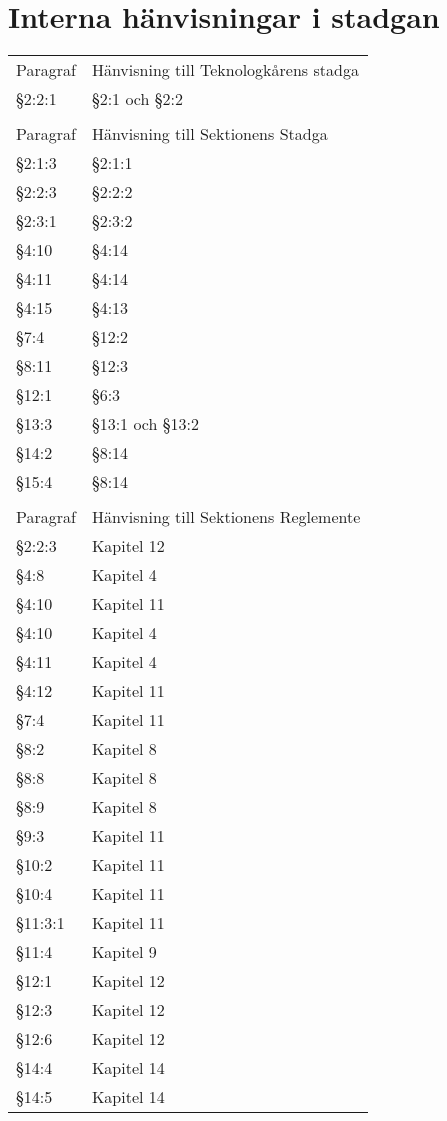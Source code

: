 \documentclass[10pt]{article}
\begin{document}
    \section*{Interna hänvisningar i stadgan}
    \renewcommand*\arraystretch{1}
    \begin{tabular}{p{15mm} p{90mm}}
        Paragraf & Hänvisning till Teknologkårens stadga\\
        §2:2:1 & §2:1 och §2:2\\
        &\\
        Paragraf & Hänvisning till Sektionens Stadga\\
        §2:1:3 & §2:1:1\\
        §2:2:3 & §2:2:2\\
        §2:3:1 & §2:3:2\\
        §4:10 & §4:14\\
        §4:11 & §4:14\\
        §4:15 & §4:13\\
        §7:4 & §12:2\\
        §8:11 & §12:3\\
        §12:1 & §6:3\\
        §13:3 & §13:1 och §13:2\\ %
        §14:2 & §8:14\\
        §15:4 & §8:14\\
        &\\
        Paragraf & Hänvisning till Sektionens Reglemente\\
        §2:2:3 & Kapitel 12\\
        §4:8 & Kapitel 4\\
        §4:10 & Kapitel 11\\
        §4:10 & Kapitel 4\\
        §4:11 & Kapitel 4\\
        §4:12 & Kapitel 11\\
        §7:4 & Kapitel 11\\
        §8:2 & Kapitel 8\\
        §8:8 & Kapitel 8\\
        §8:9 & Kapitel 8\\
        §9:3 & Kapitel 11\\
        §10:2 & Kapitel 11\\
        §10:4 & Kapitel 11\\
        §11:3:1 & Kapitel 11\\
        §11:4 & Kapitel 9\\
        §12:1 & Kapitel 12\\
        §12:3 & Kapitel 12\\
        §12:6 & Kapitel 12\\
        §14:4 & Kapitel 14\\
        §14:5 & Kapitel 14\\
    \end{tabular}
    \renewcommand*\arraystretch{1.3}
    
\end{document}
